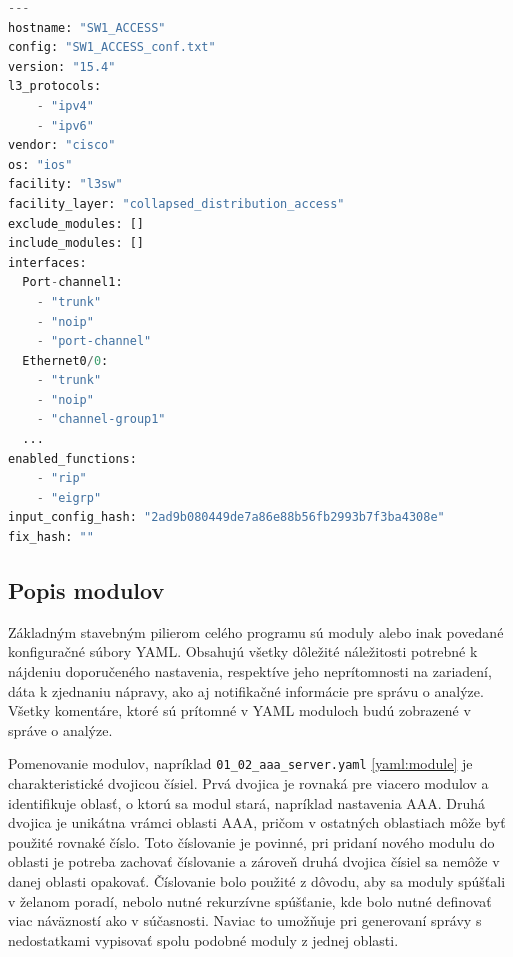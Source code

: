 \newpage
\begin{lstlisting}[frame=single,numbers=right,caption={Konfiguračný súbor \texttt{device\_info.yaml}, ktorý popisuje základné informácie o~jednom konkrétnom zariadení},label=yaml:device_info,basicstyle=\ttfamily\small\linespread{0.8}, keywordstyle=\color{black},language=python,breaklines=true]
---
hostname: "SW1_ACCESS"
config: "SW1_ACCESS_conf.txt" 
version: "15.4" 
l3_protocols:
	- "ipv4"
	- "ipv6"
vendor: "cisco"
os: "ios" 
facility: "l3sw" 
facility_layer: "collapsed_distribution_access" 
exclude_modules: []
include_modules: []
interfaces:
  Port-channel1:
	- "trunk"
	- "noip"
	- "port-channel"
  Ethernet0/0:
	- "trunk"
	- "noip"
	- "channel-group1"
  ...  
enabled_functions:
	- "rip"
	- "eigrp"
input_config_hash: "2ad9b080449de7a86e88b56fb2993b7f3ba4308e"
fix_hash: ""

\end{lstlisting}

 \newpage

\subsection{Popis modulov}
\label{module}
Základným stavebným pilierom celého programu sú moduly alebo inak povedané konfiguračné súbory YAML. Obsahujú všetky dôležité náležitosti potrebné k nájdeniu doporučeného nastavenia, respektíve jeho neprítomnosti na zariadení, dáta k zjednaniu nápravy, ako aj notifikačné informácie pre správu o analýze. Všetky komentáre, ktoré sú prítomné v YAML moduloch budú zobrazené v správe o analýze.

Pomenovanie modulov, napríklad \texttt{01\_02\_aaa\_server.yaml} \ref{yaml:module} je charakteristické dvojicou čísiel. Prvá dvojica je rovnaká pre viacero modulov a identifikuje oblasť, o ktorú sa modul stará, napríklad nastavenia AAA. Druhá dvojica je unikátna vrámci oblasti AAA, pričom v ostatných oblastiach môže byť použité rovnaké číslo. Toto číslovanie je povinné, pri pridaní nového modulu do oblasti je potreba zachovať číslovanie a zároveň druhá dvojica čísiel sa nemôže v danej oblasti opakovať. Číslovanie bolo použité z dôvodu, aby sa moduly spúšťali v želanom poradí, nebolo nutné rekurzívne spúšťanie, kde bolo nutné definovať viac náväzností ako v súčasnosti. Naviac to umožňuje pri generovaní správy s nedostatkami vypisovať spolu podobné moduly z jednej oblasti.\\  




